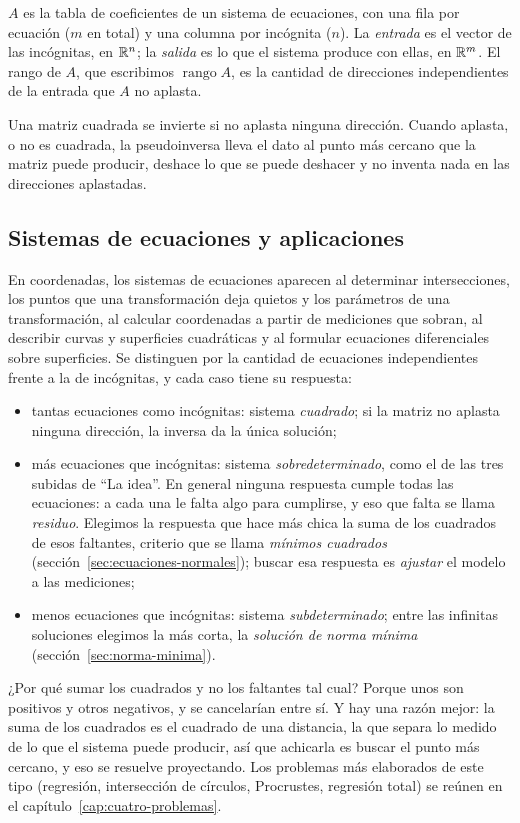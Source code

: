 \(A\) es la tabla de coeficientes de un sistema de ecuaciones, con una fila por
ecuación (\(m\) en total) y una columna por incógnita (\(n\)). La \emph{entrada} es el vector de
las incógnitas, en \(\mathbb{R}^n\); la \emph{salida} es lo que el sistema produce con ellas, en
\(\mathbb{R}^m\). El rango de \(A\), que escribimos \(\operatorname{rango}A\), es la cantidad de direcciones independientes de la
entrada que \(A\) no aplasta.

\begin{idea}
Una matriz cuadrada se invierte si no aplasta ninguna dirección. Cuando aplasta, o no es
cuadrada, la pseudoinversa lleva el dato al punto más cercano que la matriz puede producir,
deshace lo que se puede deshacer y no inventa nada en las direcciones aplastadas.
\end{idea}

\subsection{Sistemas de ecuaciones y aplicaciones}\label{sec:sistemas-ecuaciones}

En coordenadas, los sistemas de ecuaciones aparecen al determinar intersecciones, los puntos
que una transformación deja quietos y los parámetros de una transformación, al calcular
coordenadas a partir de mediciones que sobran, al describir curvas y superficies cuadráticas y
al formular ecuaciones diferenciales sobre superficies. Se distinguen por la cantidad de
ecuaciones independientes frente a la de incógnitas, y cada caso tiene su respuesta:
\begin{itemize}
  \item tantas ecuaciones como incógnitas: sistema \emph{cuadrado}; si la matriz no aplasta
  ninguna dirección, la inversa da la única solución;
  \item más ecuaciones que incógnitas: sistema \emph{sobredeterminado}, como el de las tres
  subidas de \enquote{La idea}. En general ninguna respuesta cumple todas las ecuaciones: a
  cada una le falta algo para cumplirse, y eso que falta se llama \emph{residuo}. Elegimos la
  respuesta que hace más chica la suma de los cuadrados de esos faltantes, criterio que se
  llama \emph{mínimos cuadrados} (sección~\ref{sec:ecuaciones-normales}); buscar esa
  respuesta es \emph{ajustar} el modelo a las mediciones;
  \item menos ecuaciones que incógnitas: sistema \emph{subdeterminado}; entre las infinitas
  soluciones elegimos la más corta, la \emph{solución de norma mínima}
  (sección~\ref{sec:norma-minima}).
\end{itemize}
¿Por qué sumar los cuadrados y no los faltantes tal cual? Porque unos son positivos y otros
negativos, y se cancelarían entre sí. Y hay una razón mejor: la suma de los cuadrados es el
cuadrado de una distancia, la que separa lo medido de lo que el sistema puede producir, así
que achicarla es buscar el punto más cercano, y eso se resuelve proyectando. Los problemas
más elaborados de este tipo (regresión, intersección de círculos, Procrustes, regresión
total) se reúnen en el capítulo~\ref{cap:cuatro-problemas}.

